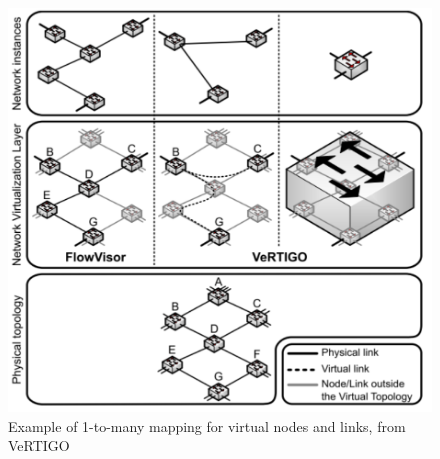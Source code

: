 \begin{figure}[ht]
\centering
\includegraphics[scale=0.8]{figures/onetomany.pdf}
\caption{Example of 1-to-many mapping for virtual nodes and links, from VeRTIGO~\cite{VeRTIGO-Corin2012a}}
\label{fig:1tomany}
\end{figure}